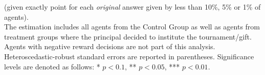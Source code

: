\begin{landscape}
\begin{table}
\begin{center}
{\begin{minipage}{0.75\linewidth}
(given exactly point for each \textit{original} answer given by less than 10\%, 5\% or 1\% of agents).\\
The estimation includes all agents from the Control Group as well as agents from treatment groups where the principal decided to institute the tournament/gift. Agents with negative reward decisions are not part of this analysis. Heteroscedastic-robust standard errors are reported in parentheses. Significance levels are denoted as follows: * $p < 0.1$, ** $p < 0.05$, *** $p < 0.01$.
\end{minipage}}
\label{tab:Summary_Statistics}
\end{center}
\end{table}
\end{landscape}